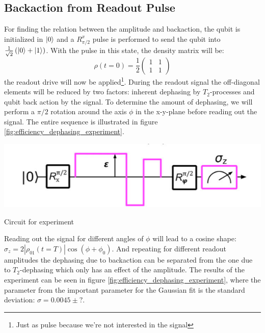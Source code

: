 \subsection{Backaction from Readout Pulse}
For finding the relation between the amplitude and backaction, the qubit is initialized in $\ket{0}$ and a $R^x_{\pi/2}$ pulse is performed to send the qubit into $\frac{1}{\sqrt{2}}\left(\ket{0} + \ket{1}\right)$. With the pulse in this state, the density matrix will be:
\begin{equation}
    \rho(t=0) = \frac12 \begin{pmatrix}1 & 1 \\ 1 & 1\end{pmatrix}
\end{equation}
the readout drive will now be applied\footnote{Just as pulse because we're not interested in the signal}. During the readout signal the off-diagonal elements will be reduced by two factors: inherent dephasing by $T_2$-processes and qubit back action by the signal. To determine the amount of dephasing, we will perform a $\pi/2$ rotation around the axis $\phi$ in the x-y-plane before reading out the signal. The entire sequence is illustrated in figure \ref{fig:efficiency_dephasing_experiment}.

\begin{marginfigure}
    \centering
    \includegraphics{Figs/calibrations/efficiency/experiment_circuit_dephasing.png}
    \caption{Circuit for experiment}
    \label{fig:efficiency_dephasing_experiment}
\end{marginfigure}

Reading out the signal for different angles of $\phi$ will lead to a cosine shape: $\sigma_z = 2 |\rho_{01}(t= T)| \cos(\phi+\phi_0)$. And repeating for different readout amplitudes the dephasing due to backaction can be separated from the one due to $T_2$-dephasing which only has an effect of the amplitude. The results of the experiment can be seen in figure \ref{fig:efficiency_dephasing_experiment}, where the parameter from the important parameter for the Gaussian fit is the standard deviation: $\sigma = 0.0045 \pm ?$. 

